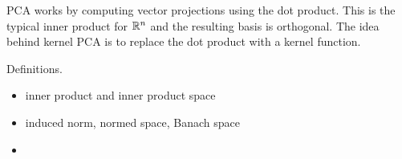 
PCA works by computing vector projections using the dot product.
This is the typical inner product for \(\mathbb{R}^n\) and the resulting basis is orthogonal.
The idea behind kernel PCA is to replace the dot product with a kernel function.

Definitions.
\begin{itemize}
    \item inner product and inner product space
    \item induced norm, normed space, Banach space
    \item 
\end{itemize}
